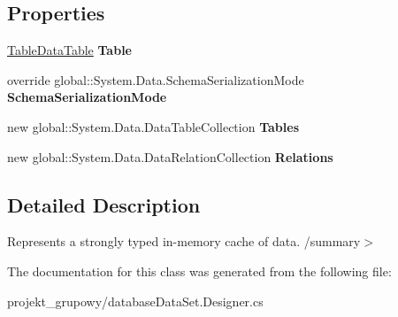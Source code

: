 \subsection*{Properties}
\begin{DoxyCompactItemize}
\item 
\mbox{\label{classprojekt__grupowy_1_1database_data_set_a0a0d8615a12d80c1112395fe8c831243}} 
\hyperlink{classprojekt__grupowy_1_1database_data_set_1_1_table_data_table}{Table\+Data\+Table} {\bfseries Table}
\item 
\mbox{\label{classprojekt__grupowy_1_1database_data_set_aca793fdd0b665ef1867d2abd09ee640a}} 
override global\+::\+System.\+Data.\+Schema\+Serialization\+Mode {\bfseries Schema\+Serialization\+Mode}
\item 
\mbox{\label{classprojekt__grupowy_1_1database_data_set_adff6a24f0cb8792b9deb60b3f49fad50}} 
new global\+::\+System.\+Data.\+Data\+Table\+Collection {\bfseries Tables}
\item 
\mbox{\label{classprojekt__grupowy_1_1database_data_set_af0d5edeb9b8ed97111cbb0230f9a28fb}} 
new global\+::\+System.\+Data.\+Data\+Relation\+Collection {\bfseries Relations}
\end{DoxyCompactItemize}


\subsection{Detailed Description}
Represents a strongly typed in-\/memory cache of data. /summary$>$ 

The documentation for this class was generated from the following file\+:\begin{DoxyCompactItemize}
\item 
projekt\+\_\+grupowy/database\+Data\+Set.\+Designer.\+cs\end{DoxyCompactItemize}
